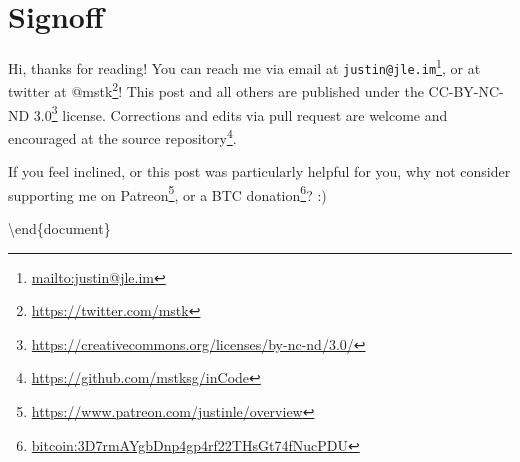 \documentclass[]{article}
\newenvironment{Shaded}{}{}
\newcommand{\CommentTok}[1]{\textcolor[rgb]{0.38,0.63,0.69}{\textit{#1}}}
\newcommand{\DataTypeTok}[1]{\textcolor[rgb]{0.56,0.13,0.00}{#1}}
\newcommand{\FunctionTok}[1]{\textcolor[rgb]{0.02,0.16,0.49}{#1}}
\newcommand{\KeywordTok}[1]{\textcolor[rgb]{0.00,0.44,0.13}{\textbf{#1}}}
\newcommand{\NormalTok}[1]{#1}
\newcommand{\OperatorTok}[1]{\textcolor[rgb]{0.40,0.40,0.40}{#1}}
\newcommand{\OtherTok}[1]{\textcolor[rgb]{0.00,0.44,0.13}{#1}}
\newcommand{\StringTok}[1]{\textcolor[rgb]{0.25,0.44,0.63}{#1}}
\renewcommand{\href}[2]{#2\footnote{\url{#1}}}
\begin{document}
\begin{Shaded}
\end{Shaded}

\section{Signoff}\label{signoff}

Hi, thanks for reading! You can reach me via email at
\href{mailto:justin@jle.im}{\nolinkurl{justin@jle.im}}, or at twitter at
\href{https://twitter.com/mstk}{@mstk}! This post and all others are published
under the \href{https://creativecommons.org/licenses/by-nc-nd/3.0/}{CC-BY-NC-ND
3.0} license. Corrections and edits via pull request are welcome and encouraged
at \href{https://github.com/mstksg/inCode}{the source repository}.

If you feel inclined, or this post was particularly helpful for you, why not
consider \href{https://www.patreon.com/justinle/overview}{supporting me on
Patreon}, or a \href{bitcoin:3D7rmAYgbDnp4gp4rf22THsGt74fNucPDU}{BTC donation}?
:)

\textbackslash end\{document\}
\end{document}
